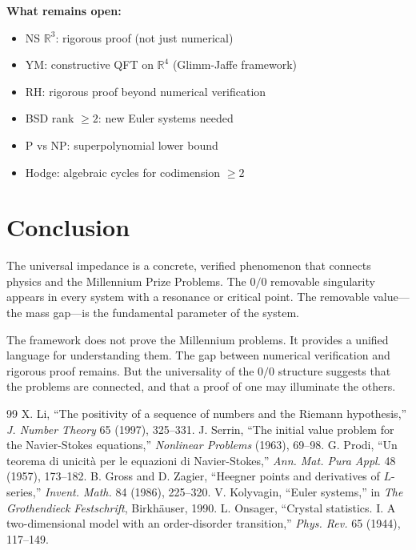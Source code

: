 \documentclass[11pt]{article}
\begin{document}
\textbf{What remains open:}
\begin{itemize}
    \item NS $\mathbb{R}^3$: rigorous proof (not just numerical)
    \item YM: constructive QFT on $\mathbb{R}^4$ (Glimm-Jaffe framework)
    \item RH: rigorous proof beyond numerical verification
    \item BSD rank $\geq 2$: new Euler systems needed
    \item P vs NP: superpolynomial lower bound
    \item Hodge: algebraic cycles for codimension $\geq 2$
\end{itemize}

\section{Conclusion}

The universal impedance is a concrete, verified phenomenon that connects physics and the Millennium Prize Problems. The $0/0$ removable singularity appears in every system with a resonance or critical point. The removable value---the mass gap---is the fundamental parameter of the system.

The framework does not prove the Millennium problems. It provides a unified language for understanding them. The gap between numerical verification and rigorous proof remains. But the universality of the $0/0$ structure suggests that the problems are connected, and that a proof of one may illuminate the others.

\begin{thebibliography}{99}
 X. Li, ``The positivity of a sequence of numbers and the Riemann hypothesis,'' \textit{J. Number Theory} 65 (1997), 325--331.
 J. Serrin, ``The initial value problem for the Navier-Stokes equations,'' \textit{Nonlinear Problems} (1963), 69--98.
 G. Prodi, ``Un teorema di unicit\`a per le equazioni di Navier-Stokes,'' \textit{Ann. Mat. Pura Appl.} 48 (1957), 173--182.
 B. Gross and D. Zagier, ``Heegner points and derivatives of $L$-series,'' \textit{Invent. Math.} 84 (1986), 225--320.
 V. Kolyvagin, ``Euler systems,'' in \textit{The Grothendieck Festschrift}, Birkh\"{a}user, 1990.
 L. Onsager, ``Crystal statistics. I. A two-dimensional model with an order-disorder transition,'' \textit{Phys. Rev.} 65 (1944), 117--149.
\end{thebibliography}
\end{document}
